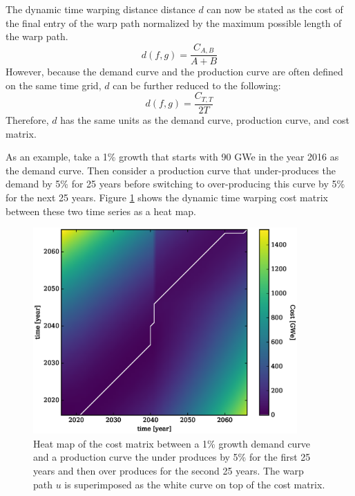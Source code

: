 The dynamic time warping distance distance $d$ can now be stated as the 
cost of the final entry of the warp path normalized by the maximum possible
length of the warp path.  
\begin{equation}
\label{d-calc-ab}
d(f, g) = \frac{C_{A,B}}{A + B}
\end{equation}
However, because the demand curve and the production curve 
are often defined on the same time grid, $d$ can be further
reduced to the following:
\begin{equation}
\label{d-calc}
d(f, g) = \frac{C_{T,T}}{2T}
\end{equation}
Therefore, $d$ has the same units as the demand curve, production curve, 
and cost matrix.

As an example, take a 1\% growth that starts with 90 GWe in the year 
2016 as the demand curve. Then consider a production curve that 
under-produces the demand by 5\% for 25 years before switching to 
over-producing this curve by 5\% for the next 25 years.  
Figure \ref{cost-demand-to-production} shows the dynamic time warping 
cost matrix between these two time series as a heat map.

\begin{figure}[htb]
\centering
\includegraphics[width=0.9\textwidth]{cost-demand-to-production.eps}
\caption{Heat map of the cost matrix between a 1\% growth demand curve and 
a production curve the under produces by 5\% for the first 25 years and then
over produces for the second 25 years.  
The warp path $u$ is superimposed as the white curve on top of the 
cost matrix.}
\label{cost-demand-to-production}
\end{figure}

